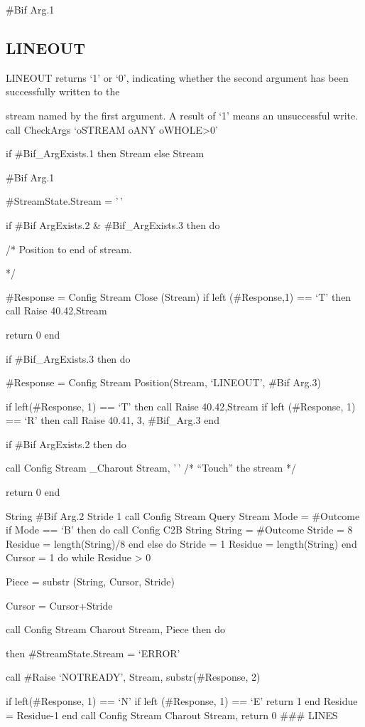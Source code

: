 \#Bif Arg.1

\hypertarget{lineout}{%
\subsection{LINEOUT}\label{lineout}}

LINEOUT returns `1' or `0', indicating whether the second argument has
been successfully written to the

stream named by the first argument. A result of `1' means an
unsuccessful write. call CheckArgs `oSTREAM oANY oWHOLE\textgreater0'

if \#Bif\_ArgExists.1 then Stream else Stream

\#Bif Arg.1

\#StreamState.Stream = '\,'

if \#Bif ArgExists.2 \& \#Bif\_ArgExists.3 then do

/* Position to end of stream.

*/

\#Response = Config Stream Close (Stream) if left (\#Response,1) == `T'
then call Raise 40.42,Stream

return 0 end

if \#Bif\_ArgExists.3 then do

\#Response = Config Stream Position(Stream, `LINEOUT', \#Bif Arg.3)

if left(\#Response, 1) == `T' then call Raise 40.42,Stream if left
(\#Response, 1) == `R' then call Raise 40.41, 3, \#Bif\_Arg.3 end

if \#Bif ArgExists.2 then do

call Config Stream \_Charout Stream, '\,' /* ``Touch'' the stream */

return 0 end

String \#Bif Arg.2 Stride 1 call Config Stream Query Stream Mode =
\#Outcome if Mode == `B' then do call Config C2B String String =
\#Outcome Stride = 8 Residue = length(String)/8 end else do Stride = 1
Residue = length(String) end Cursor = 1 do while Residue \textgreater{}
0

Piece = substr (String, Cursor, Stride)

Cursor = Cursor+Stride

call Config Stream Charout Stream, Piece then do

then \#StreamState.Stream = `ERROR'

call \#Raise `NOTREADY', Stream, substr(\#Response, 2)

if left(\#Response, 1) == `N' if left (\#Response, 1) == `E' return 1
end Residue = Residue-1 end call Config Stream Charout Stream, return 0
\#\#\# LINES

